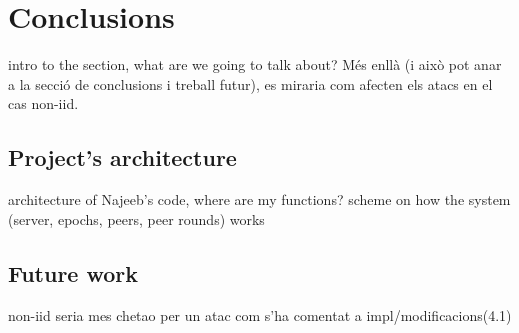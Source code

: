 \section{Conclusions}
intro to the section, what are we going to talk about?
Més enllà (i això pot anar a la secció de conclusions i treball futur), es miraria com afecten els atacs en el cas non-iid.
\subsection{Project's architecture}
architecture of Najeeb's code, where are my functions?
scheme on how the system (server, epochs, peers, peer rounds) works

\subsection{Future work}
non-iid seria mes chetao per un atac com s'ha comentat a impl/modificacions(4.1)

\pagebreak